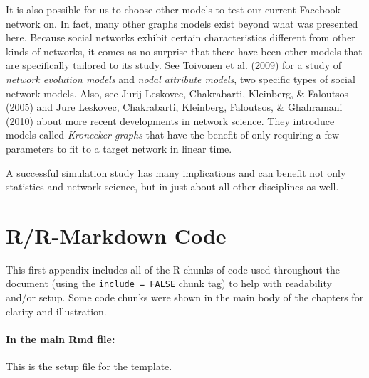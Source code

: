 \documentclass[12pt,twoside]{amherstthesis}
\begin{document}
  It is also possible for us to choose other models to test our current
  Facebook network on. In fact, many other graphs models exist beyond what
  was presented here. Because social networks exhibit certain
  characteristics different from other kinds of networks, it comes as no
  surprise that there have been other models that are specifically
  tailored to its study. See Toivonen et al. (2009) for a study of
  \emph{network evolution models} and \emph{nodal attribute models}, two
  specific types of social network models. Also, see Jurij Leskovec,
  Chakrabarti, Kleinberg, \& Faloutsos (2005) and Jure Leskovec,
  Chakrabarti, Kleinberg, Faloutsos, \& Ghahramani (2010) about more
  recent developments in network science. They introduce models called
  \emph{Kronecker graphs} that have the benefit of only requiring a few
  parameters to fit to a target network in linear time.
  
  A successful simulation study has many implications and can benefit not
  only statistics and network science, but in just about all other
  disciplines as well.
  
  \singlespacing
  
  \appendix
  
  \chapter{R/R-Markdown Code}\label{rr-markdown-code}
  
  This first appendix includes all of the R chunks of code used throughout
  the document (using the \texttt{include\ =\ FALSE} chunk tag) to help
  with readability and/or setup. Some code chunks were shown in the main
  body of the chapters for clarity and illustration.
  
  \subsubsection{In the main Rmd file:}\label{in-the-main-rmd-file}
  
  This is the setup file for the template.
  
  \begin{Shaded}
  \begin{Highlighting}[]
    \NormalTok{(}\NormalTok{, } \NormalTok{)}
    \NormalTok{(}\NormalTok{)}
  \NormalTok{\}}
  \end{Highlighting}
  \end{Shaded}
  
\end{document}
